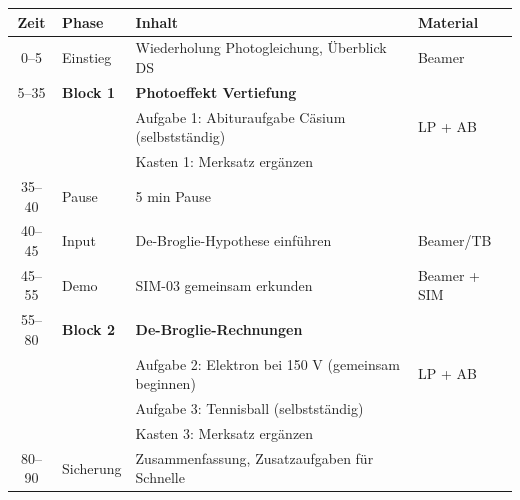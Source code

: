 \documentclass[11pt,a4paper]{article}
\begin{document}
\vspace{0.3em}

\begin{tabularx}{\textwidth}{|c|l|X|l|}
\hline
\rowcolor{physiklight}
\textbf{Zeit} & \textbf{Phase} & \textbf{Inhalt} & \textbf{Material} \\
\hline
0--5 & Einstieg & Wiederholung Photogleichung, Überblick DS & Beamer \\
\hline
5--35 & \textbf{Block 1} & \textbf{Photoeffekt Vertiefung} & \\
& & Aufgabe 1: Abituraufgabe Cäsium (selbstständig) & LP + AB \\
& & Kasten 1: Merksatz ergänzen & \\
\hline
35--40 & Pause & 5 min Pause & \\
\hline
40--45 & Input & De-Broglie-Hypothese einführen & Beamer/TB \\
\hline
45--55 & Demo & SIM-03 gemeinsam erkunden & Beamer + SIM \\
\hline
55--80 & \textbf{Block 2} & \textbf{De-Broglie-Rechnungen} & \\
& & Aufgabe 2: Elektron bei 150 V (gemeinsam beginnen) & LP + AB \\
& & Aufgabe 3: Tennisball (selbstständig) & \\
& & Kasten 3: Merksatz ergänzen & \\
\hline
80--90 & Sicherung & Zusammenfassung, Zusatzaufgaben für Schnelle & \\
\hline
\end{tabularx}

\vspace{0.5em}

\end{document}
